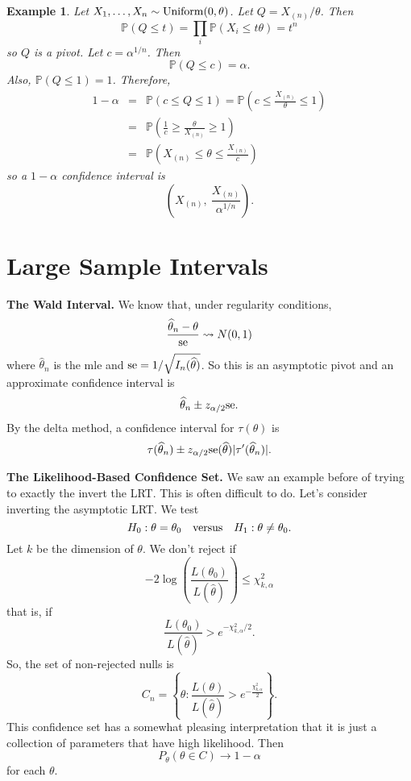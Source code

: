 \documentclass[twoside,12pt]{article}
\newtheorem{example}[theorem]{Example}
\begin{document}
\begin{example}
Let $X_1,\ldots, X_n\sim {\rm Uniform}(0,\theta)$.
Let $Q = X_{(n)}/\theta$.
Then
$$
\mathbb{P}(Q \leq t ) = \prod_i \mathbb{P}(X_i  \leq t\theta ) = t^n
$$
so $Q$ is a pivot.
Let $c = \alpha^{1/n}$.
Then
$$
\mathbb{P}( Q \leq c) = \alpha.
$$
Also, $\mathbb{P}(Q\leq 1)=1$.
Therefore,
\begin{eqnarray*}
1-\alpha &=& \mathbb{P}( c \leq Q \leq 1) = 
\mathbb{P}\left( c \leq \frac{X_{(n)}}{\theta} \leq 1\right)\\
&=& \mathbb{P}\left( \frac{1}{c} \geq \frac{\theta}{X_{(n)}} \geq 1\right)\\
&=& \mathbb{P}\left( X_{(n)} \leq \theta \leq \frac{X_{(n)}}{c}\right)
\end{eqnarray*}
so a $1-\alpha$ confidence interval is
$$
\left(  X_{(n)},\  \frac{X_{(n)}}{\alpha^{1/n}}\right).
$$
\end{example}

\section{Large Sample Intervals}

{\bf The Wald Interval.}
We know that, under regularity conditions,
$$
\frac{\widehat\theta_n - \theta}{\rm se}\rightsquigarrow N(0,1)
$$
where
$\widehat\theta_n$ is the mle and
${\rm se} = 1/\sqrt{I_n(\widehat\theta)}$.
So this is an asymptotic pivot
and an approximate confidence interval is
$$
\widehat\theta_n \pm z_{\alpha/2} {\rm se}.
$$
By the delta method,
a confidence interval for $\tau(\theta)$ is
$$
\tau(\widehat\theta_n) \pm z_{\alpha/2} {\rm se}(\widehat\theta) |\tau'(\widehat\theta_n)|.
$$

\vspace{1cm}

{\bf The Likelihood-Based Confidence Set.} We saw an example before of trying to exactly the invert the LRT. This is often difficult to do.
Let's consider inverting the asymptotic LRT.
We test
$$
H_0: \theta=\theta_0\ \ \ {\rm versus}\ \ \ H_1 :\theta \neq \theta_0.
$$
Let $k$ be the dimension of $\theta$.
We don't reject if
$$
-2 \log \left(\frac{L(\theta_0)}{L(\widehat\theta)}\right) \leq \chi^2_{k,\alpha} 
$$
that is, if
$$
\frac{L(\theta_0)}{L(\widehat\theta)} > e^{-\chi^2_{k,\alpha}/2}.
$$
So, the set of non-rejected nulls is
$$
C_n = \left\{\theta:
\frac{L(\theta)}{L(\widehat\theta)} > e^{-\frac{\chi^2_{k,\alpha}}{2}}\right\}.
$$
This confidence set has a somewhat pleasing interpretation that it is just a collection of parameters that have high likelihood.
Then
$$
P_\theta(\theta\in C) \to 1-\alpha
$$
for each $\theta$.
\end{document}
